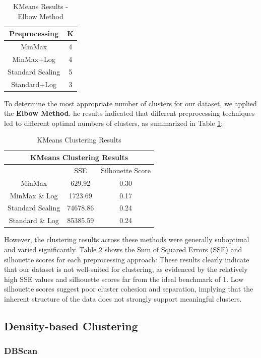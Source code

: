 \documentclass[10pt]{article}
\begin{document}
\begin{table}[ht!]
    \centering
    \begin{tabular}{|c|c|}
    \hline
    Preprocessing & K \\
    \hline
    MinMax & 4 \\
    MinMax+Log & 4 \\
    Standard Scaling & 5 \\
    Standard+Log & 3 \\
    \hline
    \end{tabular}
    \caption{KMeans Results - Elbow Method}
    \label{table:KM_K}
\end{table}
To determine the most appropriate number of clusters for our dataset, we applied the \textbf{Elbow Method}. he results indicated that different preprocessing techniques led to different optimal numbers of clusters, as summarized in Table \ref{table:KM_K}:
\begin{table}[ht!]
    \centering
    \begin{tabular}{|c|c|c|}
    \hline
    \multicolumn{3}{|c|}{KMeans Clustering Results} \\
    \hline
     & SSE & Silhouette Score \\
    \hline
    MinMax & 629.92 & 0.30 \\
    MinMax \& Log & 1723.69 & 0.17 \\
    Standard Scaling & 74678.86 & 0.24 \\
    Standard \& Log & 85385.59 & 0.24 \\
    \hline
    \end{tabular}
    \caption{KMeans Clustering Results}
    \label{table:KM}
\end{table}
However, the clustering results across these methods were generally suboptimal and varied significantly. Table \ref{table:KM} shows the Sum of Squared Errors (SSE) and silhouette scores for each preprocessing approach:
These results clearly indicate that our dataset is not well-suited for clustering, as evidenced by the relatively high SSE values and silhouette scores far from the ideal benchmark of 1. Low silhouette scores suggest poor cluster cohesion and separation, implying that the inherent structure of the data does not strongly support meaningful clusters.
\subsection{Density-based Clustering}

\subsubsection{DBScan}
\end{document}
